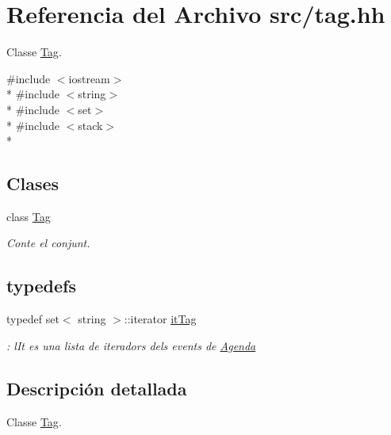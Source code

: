 \hypertarget{tag_8hh}{}\section{Referencia del Archivo src/tag.hh}
\label{tag_8hh}


Classe \hyperlink{class_tag}{Tag}.  


{\ttfamily \#include $<$iostream$>$}\\*
{\ttfamily \#include $<$string$>$}\\*
{\ttfamily \#include $<$set$>$}\\*
{\ttfamily \#include $<$stack$>$}\\*
\subsection*{Clases}
\begin{DoxyCompactItemize}
\item 
class \hyperlink{class_tag}{Tag}
\begin{DoxyCompactList}\small\item\em Conte el conjunt. \end{DoxyCompactList}\end{DoxyCompactItemize}
\subsection*{\textquotesingle{}typedefs\textquotesingle{}}
\begin{DoxyCompactItemize}
\item 
\hypertarget{tag_8hh_aa1ffaea98934d2496035b29e4bee1786}{}typedef set$<$ string $>$\+::iterator \hyperlink{tag_8hh_aa1ffaea98934d2496035b29e4bee1786}{it\+Tag}\label{tag_8hh_aa1ffaea98934d2496035b29e4bee1786}

\begin{DoxyCompactList}\small\item\em \+: l\+It es una lista de iteradors dels events de \hyperlink{class_agenda}{Agenda} \end{DoxyCompactList}\end{DoxyCompactItemize}


\subsection{Descripción detallada}
Classe \hyperlink{class_tag}{Tag}. 

